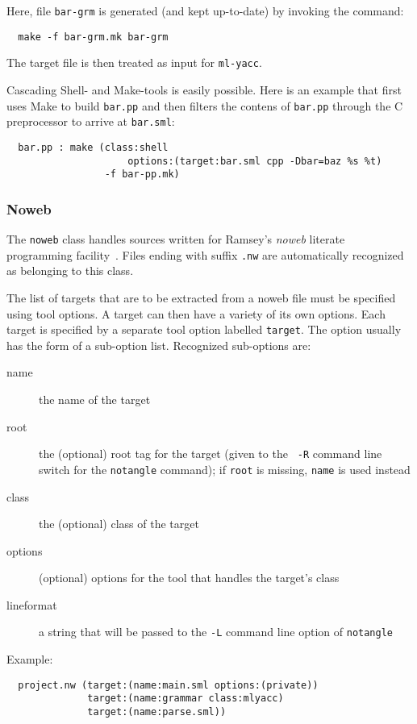 \documentclass[titlepage,letterpaper]{article}
\begin{document}
Here, file {\tt bar-grm} is generated (and kept up-to-date) by
invoking the command:
\begin{verbatim}
  make -f bar-grm.mk bar-grm
\end{verbatim}
\noindent The target file is then treated as input for {\tt ml-yacc}.

Cascading Shell- and Make-tools is easily possible.  Here is an
example that first uses Make to build {\tt bar.pp} and then filters
the contens of {\tt bar.pp} through the C preprocessor to arrive at
{\tt bar.sml}:

\begin{verbatim}
  bar.pp : make (class:shell
                     options:(target:bar.sml cpp -Dbar=baz %s %t)
                 -f bar-pp.mk)
\end{verbatim}

\subsubsection{Noweb}
\label{sec:builtin-tools:noweb}

The {\tt noweb} class handles sources written for Ramsey's {\it noweb}
literate programming facility~\cite{ramsey:simplified}.  Files ending
with suffix {\tt .nw} are automatically recognized as belonging to
this class.

The list of targets that are to be extracted from a noweb file must be
specified using tool options.  A target can then have a variety of its
own options.  Each target is specified by a separate tool option
labelled {\tt target}.  The option usually has the form of a
sub-option list.  Recognized sub-options are:

\begin{description}
\item[name] the name of the target
\item[root] the (optional) root tag for the target (given to the {\tt
-R} command line switch for the {\tt notangle} command); if {\tt root}
is missing, {\tt name} is used instead
\item[class] the (optional) class of the target
\item[options] (optional) options for the tool that handles the
target's class
\item[lineformat] a string that will be passed to the {\tt -L} command
line option of {\tt notangle}
\end{description}

Example:

\begin{verbatim}
  project.nw (target:(name:main.sml options:(private))
              target:(name:grammar class:mlyacc)
              target:(name:parse.sml))
\end{verbatim}
\end{document}
